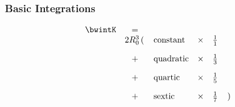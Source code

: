 
\begin{frame}\frametitle{Basic Integrations}
\begin{equation}
	\begin{array}{lclll l}
		\bwintK
		&=&  \\
		&2R_{0}^{3}\left(  \right.& \text{constant} & \times & \tfrac{1}{1}  \\[10pt]
		&+& \text{quadratic} & \times & \tfrac{1}{3}  \\[10pt]
		&+& \text{quartic} & \times & \tfrac{1}{5} \\[10pt]
		&+& \text{sextic}  & \times & \tfrac{1}{7} & \left. \right) \\
	\end{array}
\label{eq:cos-expansion-a}
\end{equation}
\end{frame}


